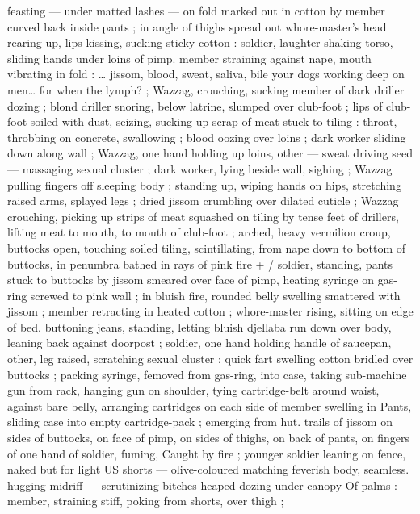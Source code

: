 {feasting --- under matted lashes --- on fold marked out in cotton by 
member curved back inside pants ; in angle of thighs spread out 
whore-master's head rearing up, lips kissing, sucking sticky cotton : 
soldier, laughter shaking torso, sliding hands under loins of pimp. 
member straining against nape, mouth vibrating in fold : {\ldots} {\gl} jissom, 
blood, sweat, saliva, bile{\td} your dogs working deep on men{\ldots} for 
when the lymph?{\td} {\gr} ; Wazzag, crouching, sucking member of dark 
driller dozing ; blond driller snoring, below latrine, slumped over 
club-foot ; lips of club-foot soiled with dust, seizing, sucking up 
scrap of meat stuck to tiling : throat, throbbing on concrete, 
swallowing ; blood oozing over loins ; dark worker sliding down along 
wall ; Wazzag, one hand holding up loins, other --- sweat driving 
seed --- massaging sexual cluster ; dark worker, lying beside wall, 
sighing ; Wazzag pulling fingers off sleeping body ; standing up, 
wiping hands on hips, stretching raised arms, splayed legs ; dried 
jissom crumbling over dilated cuticle ; Wazzag crouching, picking up 
strips of meat squashed on tiling by tense feet of drillers, lifting 
meat to mouth, to mouth of club-foot ; arched, heavy vermilion 
croup, buttocks open, touching soiled tiling, scintillating, from nape 
down to bottom of buttocks, in penumbra bathed in rays of pink fire 
+ {\slash} soldier, standing, pants stuck to buttocks by jissom smeared over 
face of pimp, heating syringe on gas-ring screwed to pink wall ; in 
bluish fire, rounded belly swelling smattered with jissom ; member 
retracting in heated cotton ; whore-master rising, sitting on edge of 
bed. buttoning jeans, standing, letting bluish djellaba run down over 
body, leaning back against doorpost ; soldier, one hand holding 
handle of saucepan, other, leg raised, scratching sexual cluster : 
quick fart swelling cotton bridled over buttocks ; packing syringe, 
femoved from gas-ring, into case, taking sub-machine gun from rack, 
hanging gun on shoulder, tying cartridge-belt around waist, against 
bare belly, arranging cartridges on each side of member swelling in 
Pants, sliding case into empty cartridge-pack ; emerging from hut. 
trails of jissom on sides of buttocks, on face of pimp, on sides of 
thighs, on back of pants, on fingers of one hand of soldier, fuming, 
Caught by fire ; younger soldier leaning on fence, naked but for light 
US shorts --- olive-coloured matching feverish body, seamless. 
hugging midriff --- scrutinizing bitches heaped dozing under canopy 
Of palms : member, straining stiff, poking from shorts, over thigh ; 
}
